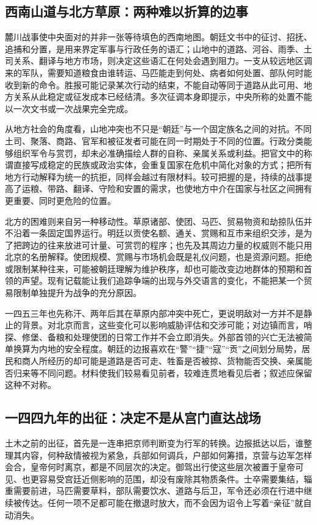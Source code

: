 \subsection{西南山道与北方草原：两种难以折算的边事}

麓川战事使中央面对的并非一张等待填色的西南地图。朝廷文书中的征讨、招抚、追捕和分置，是用来界定军事与行政任务的语汇；山地中的道路、河谷、雨季、土司关系、翻译与地方市场，则决定这些语汇在何处会遇到阻力。一支从较远地区调来的军队，需要知道粮食由谁转运、马匹能走到何处、病者如何处置、部队何时能收到新的命令。胜报可能记录某次行动的结束，不能自动等同于道路从此可用、地方关系从此稳定或征发成本已经结清。多次征调本身即提示，中央所称的处置不能以一次文书或一次战果完全完成。

从地方社会的角度看，山地冲突也不只是“朝廷”与一个固定族名之间的对抗。不同土司、聚落、商路、官军和被征发者可能在同一时期处于不同的位置。行政分类能够组织军令与赏罚，却未必准确描绘人群的自称、亲属关系或利益。把官文中的称谓直接写成稳定的民族或政治实体，会重复国家在危机中简化对象的方式；把所有地方行动解释为统一的抗拒，同样会越过有限材料。较可把握的是，持续的战事提高了运粮、带路、翻译、守险和安置的需求，也使地方中介在国家与社区之间拥有更重要、同时更危险的位置。

北方的困难则来自另一种移动性。草原诸部、使团、马匹、贸易物资和劫掠队伍并不沿着一条固定国界运行。明廷以贡使名额、通关、赏赐和互市来组织交涉，是为了把跨边的往来放进可计量、可赏罚的程序；也先及其周边力量的权威则不能只用北京的名册解释。使团规模、赏赐与市场机会既是礼仪问题，也是资源问题。拒绝或限制某种往来，可能被朝廷理解为维护秩序，却也可能改变边地群体的预期和首领的声望。现有记载能让我们追踪争端的出现与外交语言的变化，不能把某一个贸易限制单独提升为战争的充分原因。

一四五三年也先称汗、两年后其在草原内部冲突中死亡，更说明敌对一方并不是静止的背景。对北京而言，这些变化可以影响威胁评估和交涉可能；对边镇而言，哨探、修堡、备粮和处理使团的日常工作并不会立即消失。外部首领的兴亡无法被简单换算为内地的安全程度。朝廷的边报喜欢在“警”“捷”“寇”“贡”之间划分局势，居民和商人所经历的却可能是道路是否可走、牲畜是否被掠、货物能否交换、亲属能否归来等不同问题。材料使我们较易看见前者，较难连贯地看见后者；叙述应保留这种不对称。

\subsection{一四四九年的出征：决定不是从宫门直达战场}

土木之前的出征，首先是一连串把京师判断变为行军的转换。边报抵达以后，谁整理其内容，何种敌情被视为紧急，兵部如何调兵，户部如何筹措，京营与边军怎样会合，皇帝何时离京，都是不同层次的决定。御驾出行使这些层次被置于皇帝可见、也更容易受宫廷近侧影响的范围，却没有废除其物质条件。士卒需要集结，辎重需要前进，马匹需要草料，部队需要饮水、道路与后卫，军令还必须在行进中继续被传达。任何一项不足都可能在撤退时放大，而不会因为诏令上写着“亲征”就自动消失。

